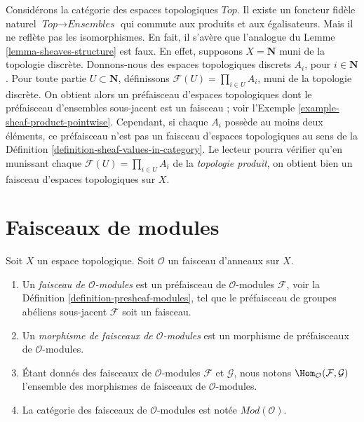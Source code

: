 \begin{example}
\label{example-sheaves-topological-spaces}
Considérons la catégorie des espaces topologiques $\textit{Top}$.
Il existe un foncteur fidèle naturel $\textit{Top} \to \textit{Ensembles}$
qui commute aux produits et aux égalisateurs. Mais il ne
reflète pas les isomorphismes. En fait, il s'avère que
l'analogue du Lemme \ref{lemma-sheaves-structure} est faux.
En effet, supposons $X = \mathbf{N}$ muni de la topologie
discrète. Donnons-nous des espaces topologiques discrets $A_i$, pour
$i \in \mathbf{N}$. Pour toute partie $U \subset \mathbf{N}$,
définissons $\mathcal{F}(U) = \prod_{i\in U} A_i$, muni de la
topologie discrète. On obtient alors un préfaisceau d'espaces
topologiques dont le préfaisceau d'ensembles sous-jacent est un faisceau ; voir
l'Exemple \ref{example-sheaf-product-pointwise}.
Cependant, si chaque $A_i$ possède au moins deux éléments, ce
préfaisceau n'est pas un faisceau d'espaces topologiques
au sens de la Définition \ref{definition-sheaf-values-in-category}.
Le lecteur pourra vérifier qu'en munissant chaque
$\mathcal{F}(U) = \prod_{i\in U} A_i$ de la {\it topologie produit}, on
obtient bien un faisceau
d'espaces topologiques sur $X$.
\end{example}


\section{Faisceaux de modules}
\label{section-sheaves-modules}

\begin{definition}
\label{definition-sheaf-modules}
Soit $X$ un espace topologique.
Soit $\mathcal{O}$ un faisceau d'anneaux sur $X$.
\begin{enumerate}
\item Un {\it faisceau de $\mathcal{O}$-modules} est un préfaisceau
de $\mathcal{O}$-modules $\mathcal{F}$,
voir la Définition \ref{definition-presheaf-modules},
tel que le préfaisceau de groupes abéliens sous-jacent $\mathcal{F}$
soit un faisceau.
\item Un {\it morphisme de faisceaux de $\mathcal{O}$-modules}
est un morphisme de préfaisceaux de $\mathcal{O}$-modules.
\item Étant donnés des faisceaux de $\mathcal{O}$-modules
$\mathcal{F}$ et $\mathcal{G}$, nous notons
$\Hom_\mathcal{O}(\mathcal{F}, \mathcal{G})$
l'ensemble des morphismes de faisceaux de $\mathcal{O}$-modules.
\item La catégorie des faisceaux de $\mathcal{O}$-modules
est notée $\textit{Mod}(\mathcal{O})$.
\end{enumerate}
\end{definition}

